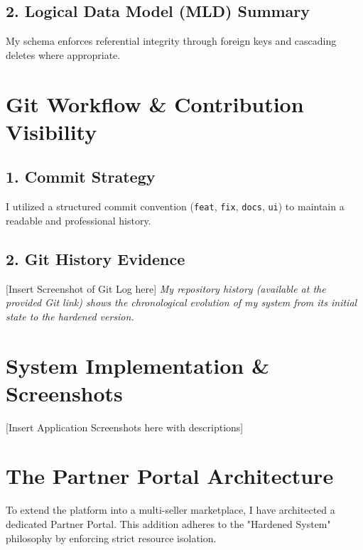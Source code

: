 \documentclass[12pt,a4paper]{article}
\begin{document}
\subsection{2. Logical Data Model (MLD) Summary}
My schema enforces referential integrity through foreign keys and cascading deletes where appropriate.

\section{Git Workflow \& Contribution Visibility}

\subsection{1. Commit Strategy}
I utilized a structured commit convention (\texttt{feat}, \texttt{fix}, \texttt{docs}, \texttt{ui}) to maintain a readable and professional history.

\subsection{2. Git History Evidence}
[Insert Screenshot of Git Log here]
\textit{My repository history (available at the provided Git link) shows the chronological evolution of my system from its initial state to the hardened version.}

\section{System Implementation \& Screenshots}

[Insert Application Screenshots here with descriptions]

\section{The Partner Portal Architecture}

To extend the platform into a multi-seller marketplace, I have architected a dedicated Partner Portal. This addition adheres to the "Hardened System" philosophy by enforcing strict resource isolation.
\end{document}

